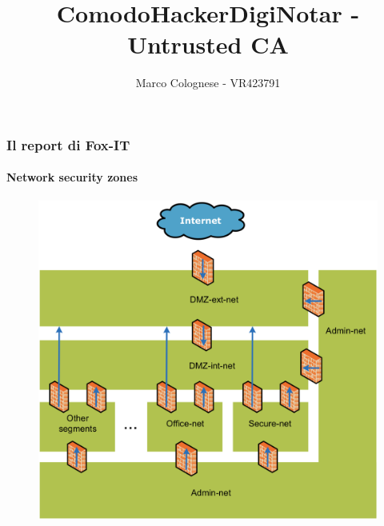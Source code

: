 \documentclass{beamer}
\begin{document}
\begin{frame}
\frametitle{Il report di Fox-IT}
\framesubtitle{Network security zones}
\begin{figure}[H]
	\centering
	\includegraphics[scale=0.39]{net}
\end{figure}
\end{frame}


\title{ComodoHacker}
\subtitle{}
\institute{}
\author{}
\begin{frame}
	\titlepage
\end{frame}
\title{DigiNotar - Untrusted CA}
\author{Marco Colognese - VR423791}
\end{document}
